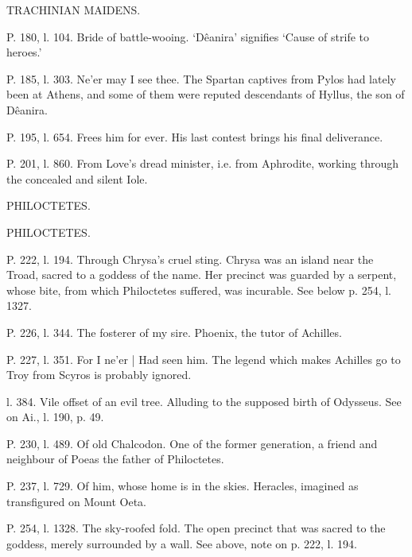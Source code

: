 \documentclass[11pt,letter]{book}
\begin{document}
\par  TRACHINIAN MAIDENS.

\par  P. 180, l. 104. Bride of battle-wooing. ‘Dêanira’ signifies ‘Cause of strife to heroes.’

\par  P. 185, l. 303. Ne’er may I see thee. The Spartan captives from Pylos had lately been at Athens, and some of them were reputed descendants of Hyllus, the son of Dêanira.

\par  P. 195, l. 654. Frees him for ever. His last contest brings his final deliverance.

\par  P. 201, l. 860. From Love’s dread minister, i.e. from Aphrodite, working through the concealed and silent Iole.

\par  [page 316]PHILOCTETES.

\par  [page 316]PHILOCTETES.

\par  P. 222, l. 194. Through Chrysa’s cruel sting. Chrysa was an island near the Troad, sacred to a goddess of the name. Her precinct was guarded by a serpent, whose bite, from which Philoctetes suffered, was incurable. See below p. 254, l. 1327.

\par  P. 226, l. 344. The fosterer of my sire. Phoenix, the tutor of Achilles.

\par  P. 227, l. 351. For I ne’er | Had seen him. The legend which makes Achilles go to Troy from Scyros is probably ignored.

\par  l. 384. Vile offset of an evil tree. Alluding to the supposed birth of Odysseus. See on Ai., l. 190, p. 49.

\par  P. 230, l. 489. Of old Chalcodon. One of the former generation, a friend and neighbour of Poeas the father of Philoctetes.

\par  P. 237, l. 729. Of him, whose home is in the skies. Heracles, imagined as transfigured on Mount Oeta.

\par  P. 254, l. 1328. The sky-roofed fold. The open precinct that was sacred to the goddess, merely surrounded by a wall. See above, note on p. 222, l. 194.
\end{document}
